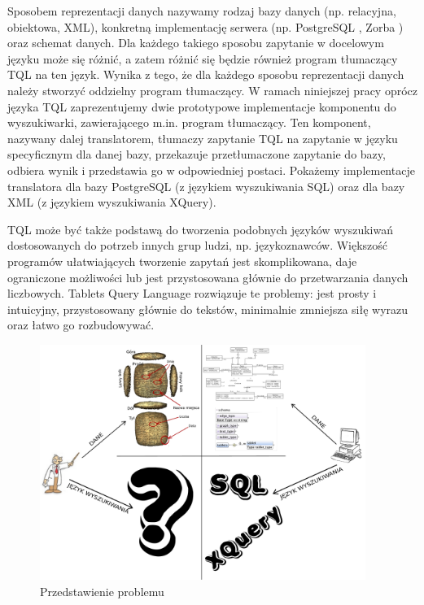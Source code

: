 Sposobem reprezentacji danych nazywamy rodzaj bazy danych (np. relacyjna, obiektowa, XML), konkretną implementację serwera 
(np. PostgreSQL \cite{postgres}, Zorba \cite{zorba}) oraz schemat danych. Dla każdego takiego sposobu zapytanie w docelowym 
języku może się różnić, a zatem różnić się będzie również program tłumaczący TQL na ten język.
Wynika z tego, że dla każdego sposobu reprezentacji danych należy stworzyć oddzielny program tłumaczący. 
W ramach niniejszej pracy oprócz języka TQL zaprezentujemy dwie prototypowe implementacje komponentu do wyszukiwarki, zawierającego 
m.in. program tłumaczący.
Ten komponent, nazywany dalej translatorem, tłumaczy zapytanie TQL na zapytanie w języku specyficznym dla danej bazy, przekazuje 
przetłumaczone zapytanie do bazy, odbiera wynik i przedstawia go w odpowiedniej postaci. Pokażemy implementacje translatora dla bazy 
PostgreSQL (z językiem wyszukiwania SQL) oraz dla bazy XML (z językiem wyszukiwania XQuery).


TQL może być także podstawą do tworzenia podobnych języków wyszukiwań dostosowanych do potrzeb innych grup ludzi, np. językoznawców.
Większość programów ułatwiających tworzenie zapytań jest skomplikowana, daje ograniczone możliwości lub jest przystosowana głównie do 
przetwarzania danych liczbowych. Tablets Query Language rozwiązuje te problemy: jest prosty i intuicyjny, przystosowany głównie do tekstów,
 minimalnie zmniejsza siłę wyrazu oraz łatwo go rozbudowywać. 




\begin{figure}[h]
 \centering
 \includegraphics[width=400px]{../diagramy/poco.pdf}
 \caption{Przedstawienie problemu}
 \label{fig:poco}
\end{figure}

